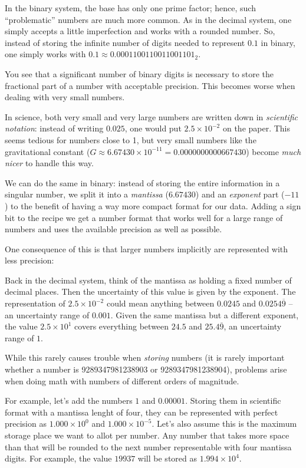\begin{plusbox}
In the binary system, the base has only one prime factor; hence, such \enquote{problematic} numbers are much more common. As in the decimal system, one simply accepts a little imperfection and works with a rounded number. So, instead of storing the infinite number of digits needed to represent $0.1$ in binary, one simply works with $0.1 \approx 0.0001100110011001101_2$.

You see that a significant number of binary digits is necessary to store the fractional part of a number with acceptable precision. This becomes worse when dealing with very small numbers.

In science, both very small and very large numbers are written down in \emph{scientific notation}: instead of writing $0.025$, one would put $2.5 \times 10^{-2}$ on the paper. This seems tedious for numbers close to 1, but very small numbers like the gravitational constant ($G \approx 6.67430 \times 10^{-11} = 0.0000000000667430$) become \emph{much nicer} to handle this way.

We can do the same in binary: instead of storing the entire information in a singular number, we split it into a \emph{mantissa} ($6.67430$) and an \emph{exponent} part ($-11$) to the benefit of having a way more compact format for our data. Adding a sign bit to the recipe we get a number format that works well for a large range of numbers and uses the available precision as well as possible.

One consequence of this is that larger numbers implicitly are represented with less precision:

Back in the decimal system, think of the mantissa as holding a fixed number of decimal places. Then the uncertainty of this value is given by the exponent. The representation of $2.5 \times 10^{-2}$ could mean anything between $0.0245$ and $0.0254\overline{9}$ -- an uncertainty range of $0.001$. Given the same mantissa but a different exponent, the value $2.5 \times 10^{1}$ covers everything between $24.5$ and $25.4\overline{9}$, an uncertainty range of $1$.

While this rarely causes trouble when \emph{storing} numbers (it is rarely important whether a number is 9289347981238903 or 9289347981238904), problems arise when doing math with numbers of different orders of magnitude.

For example, let's add the numbers $1$ and $0.00001$. Storing them in scientific format with a mantissa lenght of four, they can be represented with perfect precision as $1.000 \times 10^{0}$ and $1.000 \times 10^{-5}$. Let's also assume this is the maximum storage place we want to allot per number. Any number that takes more space than that will be rounded to the next number representable with four mantissa digits. For example, the value $19937$ will be stored as $1.994 \times 10^{4}$.
\end{plusbox}
